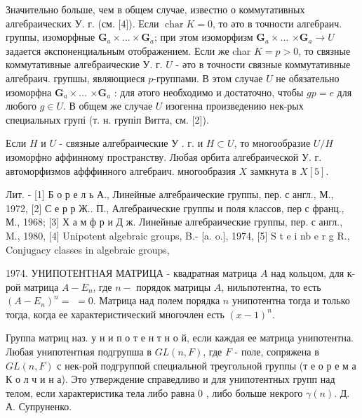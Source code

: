 \documentclass[10pt]{article}
\begin{document}
Значительно больше, чем в общем случае, известно о коммутативных алгебраических У. г. (см. [4]). Если $\operatorname{char} K=0$, то әто в точности алгебраич. группы, изоморфные $\mathbf{G}_{a} \times \ldots \times \mathbf{G}_{a}$; при этом изоморфизм $\mathbf{G}_{a} \times \ldots$ $\times \mathbf{G}_{a} \rightarrow U$ задается әкспоненциальным отображением. Если же char $K=p>0$, то связные коммутативные алгебраические У. г. $U$ - әто в точности связные коммутативные алгебраич. групшы, являющиеся $p$-группами. В этом случае $U$ не обязательно изоморфна $\mathbf{G}_{a} \times \ldots$ $\times \mathbf{G}_{a}$ : для әтого необходимо и достаточно, чтобы $g p=e$ для любого $g \in U$. В общем же случае $U$ изогенна произведению нек-рых специальных групі (т. н. групіп Витта, см. [2]).



Если $H$ и $U$ - связные алгебраические У . г. и $H \subset U$, то многообразие $U / H$ изоморфно аффинному пространству. Любая орбита алгебраической У. г. автоморфизмов афффинного алгебраич. многообразия $X$ замкнута в $X[5]$.



Лит. - [1] Б о р е л ь А., Линейные алгебраические группы, пер. с англ., М., 1972, [2] С е р р Ж.. П., Алгебраические группы и поля классов, пер с франц., М., 1968; [3] Х а м ф р и Д ж. Линейные алгебраические группы, пер. с англ., M., 1980, [4] Unipotent algebraic groups, B.- [a. o.], 1974, [5] S t e i nb e r g R., Conjugacy classes in algebraic groups,

1974. УНИПОТЕНТНАЯ МАТРИЦА - квадратная матрица $A$ над кольцом, для к-рой матрица $A-E_{n}$, где $n-$ порядок матрицы $A$, нильпотентна, то есть $\left(A-E_{n}\right)^{n}=$ $=0$. Матрица над полем порядка $n$ унипотентна тогда и только тогда, когда ее характеристический многочлен есть $(x-1)^{n}$.



Группа матриц наз. у н и п о т е н т н о й, если каждая ее матрица унипотентна. Любая унипотентная подгрупша в $G L(n, F)$, где $F$ - поле, сопряжена в $G L(n, F)$ с нек-рой подгруппой специальной треугольной группы (т е о р е м а $К$ о л ч и н а). Это утверждение справедливо и для унипотентных групп над телом, если характеристика тела либо равна 0 , либо больше некрого $\gamma(n)$. Д. А. Супруненко.
\end{document}
